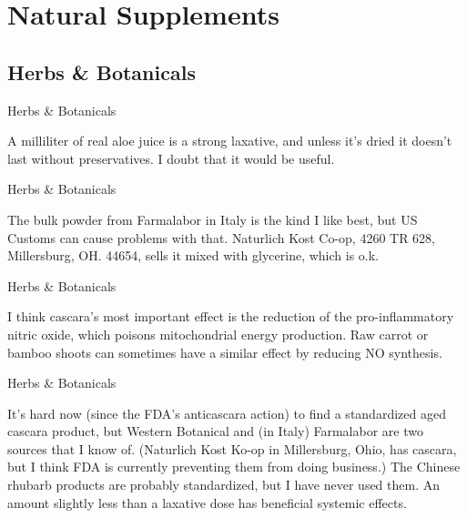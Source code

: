 \documentclass[11pt,oneside,openany,extrafontsizes]{memoir}
\begin{document}
\section{Natural Supplements}
\subsection{Herbs \& Botanicals}

\begin{standalonequote}{Herbs \& Botanicals}

    \begin{answer}
        A milliliter of real aloe juice is a strong laxative, and unless it's dried it doesn't last without preservatives. I doubt that it would be useful.
    \end{answer}
\end{standalonequote}

\begin{standalonequote}{Herbs \& Botanicals}

    \begin{answer}
        The bulk powder from Farmalabor in Italy is the kind I like best, but US Customs can cause problems with that. Naturlich Kost Co-op, 4260 TR 628, Millersburg, OH. 44654, sells it mixed with glycerine, which is o.k.
    \end{answer}
\end{standalonequote}

\begin{standalonequote}{Herbs \& Botanicals}

    \begin{answer}
        I think cascara's most important effect is the reduction of the pro-inflammatory nitric oxide, which poisons mitochondrial energy production. Raw carrot or bamboo shoots can sometimes have a similar effect by reducing NO synthesis.
    \end{answer}
\end{standalonequote}

\begin{standalonequote}{Herbs \& Botanicals}

    \begin{answer}
        It's hard now (since the FDA's anticascara action) to find a standardized aged cascara product, but Western Botanical and (in Italy) Farmalabor are two sources that I know of. (Naturlich Kost Ko-op in Millersburg, Ohio, has cascara, but I think FDA is currently preventing them from doing business.) The Chinese rhubarb products are probably standardized, but I have never used them. An amount slightly less than a laxative dose has beneficial systemic effects.
    \end{answer}
\end{standalonequote}
\end{document}
